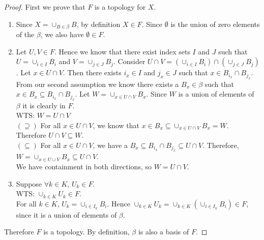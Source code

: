 \begin{proof}
First we prove that $F$ is a topology for $X$. 
\begin{enumerate}
	\item Since $X = \displaystyle{\cup_{B \in \beta} B}$, by definition $X \in F$. Since $\emptyset$ is the union of zero elements of the $\beta$, we also have $\emptyset \in F$. 
	\item Let $U, V \in F$. Hence we know that there exist index sets $I$ and $J$ such that $U = \cup_{i \in I}B_i$ and $V = \cup_{j \in J}B_j$. Consider $U \cap V = ( \cup_{i \in I}B_i) \cap (\cup_{j \in J}B_j)$. Let $x \in  U \cap V$. Then there exists $i_x \in I$ and $j_x \in J$ such that $x \in B_{i_x} \cap B_{j_x}$. From our second assumption we know there exists a $B_x \in \beta$ such that $x \in B_x \subseteq B_{i_x} \cap B_{j_x}$. Let $W = \cup_{x \in U \cap V} B_x$. Since $W$ is a union of elements of $\beta$ it is clearly in $F$. \\
WTS: $W = U \cap V$\\
$(\supseteq)$ For all $x \in U \cap V$, we know that $x \in B_x \subseteq \cup_{x \in U \cap V}B_x = W$. Therefore $U \cap V \subseteq W$. \\
$(\subseteq)$ For all $x \in U \cap V$, we have a $B_x \subseteq B_{i_x} \cap B_{j_x} \subseteq U \cap V$. Therefore, $W = \cup_{x \in U \cup V} B_x \subseteq U \cap V$.\\
We have containment in both directions, so  $W = U \cap V$. 
	\item Suppose $\forall k \in K$, $U_k \in F$. \\
	WTS: $\cup_{k \in K}U_k \in F$. \\
	For all $k \in K$, $U_k = \cup_{i \in I_k} B_i$. Hence $\cup_{k \in K}U_k = \cup_{k \in K} (\cup_{i \in I_k} B_i) \in F$, since it is a union of elements of $\beta$. 
\end{enumerate}
Therefore $F$ is a topology. By definition, $\beta$ is also a basis of $F$. 
\end{proof}

